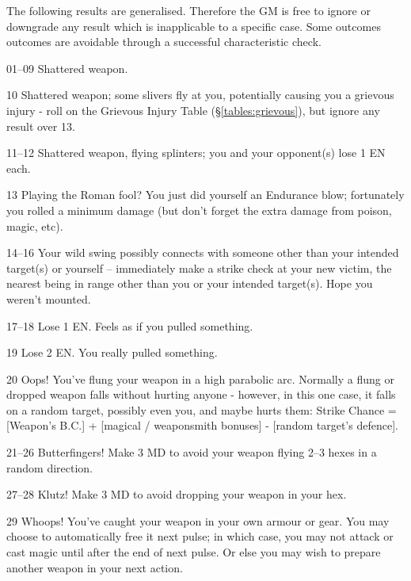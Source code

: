\begin{multicols*}{3}
The following results are generalised.  Therefore the GM is free to
ignore or downgrade any result which is inapplicable to a specific
case. Some outcomes outcomes are avoidable through a successful
characteristic check.

\begin{Description}
\item[01--09] Shattered weapon.

\item[10] Shattered weapon; some slivers fly at you, potentially
causing you a grievous injury - roll on the Grievous Injury Table
(\S\ref{tables:grievous}), but ignore any result over 13.

\item[11--12] Shattered weapon, flying splinters; you and your
opponent(s) lose 1 EN each.

\item[13] Playing the Roman fool? You just did yourself an Endurance
blow; fortunately you rolled a minimum damage (but don't forget the
extra damage from poison, magic, etc).

\item[14--16] Your wild swing possibly connects with someone other than
your intended target(s) or yourself -- immediately make a strike check
at your new victim, the nearest being in range other than you or your
intended target(s). Hope you weren't mounted.

\item[17--18] Lose 1 EN. Feels as if you pulled something.

\item[19] Lose 2 EN. You really pulled something.

\item[20] Oops! You've flung your weapon in a high parabolic
arc. Normally a flung or dropped weapon falls without hurting anyone -
however, in this one case, it falls on a random target, possibly even
you, and maybe hurts them: Strike Chance = [Weapon's B.C.] + [magical
/ weaponsmith bonuses] - [random target's defence].

\item[21--26] Butterfingers! Make 3 \x MD to avoid your weapon flying
2--3 hexes in a random direction.

\item[27--28] Klutz! Make 3 \x MD to avoid dropping your weapon in your hex.

\item[29] Whoops! You've caught your weapon in your own armour or
gear. You may choose to automatically free it next pulse; in which
case, you may not attack or cast magic until after the end of next
pulse. Or else you may wish to prepare another weapon in your next
action.


\end{Description}
\end{multicols*}
